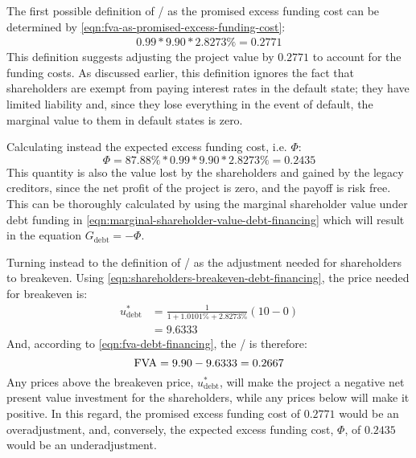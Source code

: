 \documentclass[main.tex]{subfiles}
\begin{document}
        The first possible definition of \FVA/ as the promised excess funding cost can be determined by
        \cref{eqn:fva-as-promised-excess-funding-cost}:
            \begin{align}
                0.99 * 9.90 * 2.8273\% = 0.2771
            \end{align}
        This definition suggests adjusting the project value by $0.2771$ to account for the funding costs.
        As discussed earlier, this definition ignores the fact that shareholders are exempt from paying
        interest rates in the default state; they have limited liability and, since they lose everything
        in the event of default, the marginal value to them in default states is zero.
        
        Calculating instead the expected excess funding cost, i.e. $\Phi$:
            \begin{equation}
                \Phi 
                = 87.88\% * 0.99  * 9.90 * 2.8273\% 
                = 0.2435
            \end{equation}
        This quantity is also the value lost by the shareholders and gained by the legacy creditors,
        since the net profit of the project is zero, and the payoff is risk free.
        This can be thoroughly calculated by using the marginal shareholder value under debt funding in 
        \cref{eqn:marginal-shareholder-value-debt-financing}
        which will result in the equation $G_{\text{debt}} = -\Phi$. 
        
        Turning instead to the definition of \FVA/ as the adjustment needed for shareholders to breakeven.
        Using \cref{eqn:shareholders-breakeven-debt-financing}, the price needed for breakeven is:
            \begin{align}
                    u^{\ast}_{\text{debt}} 
                &=
                    \frac{
                        1
                    }{
                        1 + 1.0101\% + 2.8273\%
                    }
                    \left(
                        10
                        -
                        0
                    \right)
                \nonumber \\
                &=
                    9.6333
            \end{align}
        And, according to \cref{eqn:fva-debt-financing}, the \FVA/ is therefore:
            \begin{equation}
                    \FVA/ 
                =
                    9.90 - 9.6333
                =
                    0.2667
            \end{equation}
        Any prices above the breakeven price, $u^{\ast}_{\text{debt}}$, 
        will make the project a negative net present value investment for the shareholders, while any prices below will make it positive. 
        In this regard, the promised excess funding cost of $0.2771$ would be an overadjustment,
        and, conversely, the expected excess funding cost, $\Phi$, of $0.2435$ would be an underadjustment.
\end{document}
